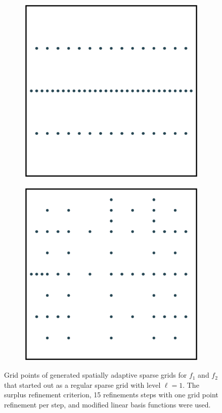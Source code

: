\documentclass[
  a4paper,  %
  twoside,  %
  bibliography=totoc,
  headsepline,
  cleardoublepage=empty,
  parskip=half,
  draft=false
]{scrbook}
\begin{document}
\begin{mdframed}[style=style]
\begin{figure}[H]
\begin{subfigure}{.5\textwidth}
  \centering
  \includegraphics[width=.65\linewidth]{graphics/grid_f1}
  \label{fig:grid_f1}
\vspace{2.5mm}
\end{subfigure}%
\begin{subfigure}{.5\textwidth}
  \centering
  \includegraphics[width=.65\linewidth]{graphics/grid_f2}
  \label{fig:grid_f2}
\vspace{2.5mm}
\end{subfigure}
\delimit
\caption{Grid points of generated spatially adaptive sparse grids for $f_1$ and $f_2$ that started out as a regular sparse grid with level $\ell=1$. The surplus refinement criterion, 15 refinements steps with one grid point refinement per step, and modified linear basis functions were used.}
\label{fig:grids}
\end{figure}
\end{mdframed}
\end{document}
